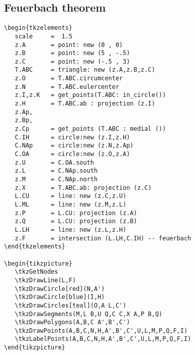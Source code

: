 \subsection{Feuerbach theorem} %
\label{sub:nine_points}
\begin{minipage}[t]{.5\textwidth}\vspace{0pt}%
\begin{Verbatim}
\begin{tkzelements}
   scale     =  1.5
   z.A       = point: new (0 , 0)
   z.B       = point: new (5 , -.5)
   z.C       = point: new (-.5 , 3)
   T.ABC     = triangle: new (z.A,z.B,z.C)
   z.O       = T.ABC.circumcenter
   z.N       = T.ABC.eulercenter
   z.I,z.K   = get_points(T.ABC: in_circle())
   z.H       = T.ABC.ab : projection (z.I)
   z.Ap,
   z.Bp,
   z.Cp      = get_points (T.ABC : medial ())
   C.IH      = circle:new (z.I,z.H)
   C.NAp     = circle:new (z.N,z.Ap)
   C.OA      = circle:new (z.O,z.A)
   z.U       = C.OA.south
   z.L       = C.NAp.south
   z.M       = C.NAp.north
   z.X       = T.ABC.ab: projection (z.C)
   L.CU      = line: new (z.C,z.U)
   L.ML      = line: new (z.M,z.L)
   z.P       = L.CU: projection (z.A)
   z.Q       = L.CU: projection (z.B)
   L.LH      = line: new (z.L,z.H)
   z.F       = intersection (L.LH,C.IH) -- feuerbach
\end{tkzelements}

\begin{tikzpicture}
   \tkzGetNodes
   \tkzDrawLine(L,F)
   \tkzDrawCircle[red](N,A')
   \tkzDrawCircle[blue](I,H)
   \tkzDrawCircles[teal](O,A L,C')
   \tkzDrawSegments(M,L B,U Q,C C,X A,P B,Q)
   \tkzDrawPolygons(A,B,C A',B',C')
   \tkzDrawPoints(A,B,C,N,H,A',B',C',U,L,M,P,Q,F,I)
   \tkzLabelPoints(A,B,C,N,H,A',B',C',U,L,M,P,Q,F,I)
\end{tikzpicture}
\end{Verbatim}
\end{minipage}
